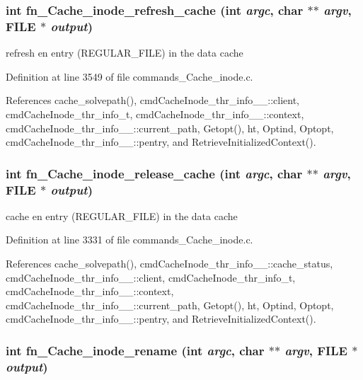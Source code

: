 \subsubsection{\setlength{\rightskip}{0pt plus 5cm}int fn\_\-Cache\_\-inode\_\-refresh\_\-cache (int {\em argc}, char $\ast$$\ast$ {\em argv}, FILE $\ast$ {\em output})}\label{commands_8h_a52}


refresh en entry (REGULAR\_\-FILE) in the data cache 

Definition at line 3549 of file commands\_\-Cache\_\-inode.c.

References cache\_\-solvepath(), cmd\-Cache\-Inode\_\-thr\_\-info\_\-\_\-::client, cmd\-Cache\-Inode\_\-thr\_\-info\_\-t, cmd\-Cache\-Inode\_\-thr\_\-info\_\-\_\-::context, cmd\-Cache\-Inode\_\-thr\_\-info\_\-\_\-::current\_\-path, Getopt(), ht, Optind, Optopt, cmd\-Cache\-Inode\_\-thr\_\-info\_\-\_\-::pentry, and Retrieve\-Initialized\-Context().
\subsubsection{\setlength{\rightskip}{0pt plus 5cm}int fn\_\-Cache\_\-inode\_\-release\_\-cache (int {\em argc}, char $\ast$$\ast$ {\em argv}, FILE $\ast$ {\em output})}\label{commands_8h_a54}


cache en entry (REGULAR\_\-FILE) in the data cache 

Definition at line 3331 of file commands\_\-Cache\_\-inode.c.

References cache\_\-solvepath(), cmd\-Cache\-Inode\_\-thr\_\-info\_\-\_\-::cache\_\-status, cmd\-Cache\-Inode\_\-thr\_\-info\_\-\_\-::client, cmd\-Cache\-Inode\_\-thr\_\-info\_\-t, cmd\-Cache\-Inode\_\-thr\_\-info\_\-\_\-::context, cmd\-Cache\-Inode\_\-thr\_\-info\_\-\_\-::current\_\-path, Getopt(), ht, Optind, Optopt, cmd\-Cache\-Inode\_\-thr\_\-info\_\-\_\-::pentry, and Retrieve\-Initialized\-Context().
\subsubsection{\setlength{\rightskip}{0pt plus 5cm}int fn\_\-Cache\_\-inode\_\-rename (int {\em argc}, char $\ast$$\ast$ {\em argv}, FILE $\ast$ {\em output})}\label{commands_8h_a44}


